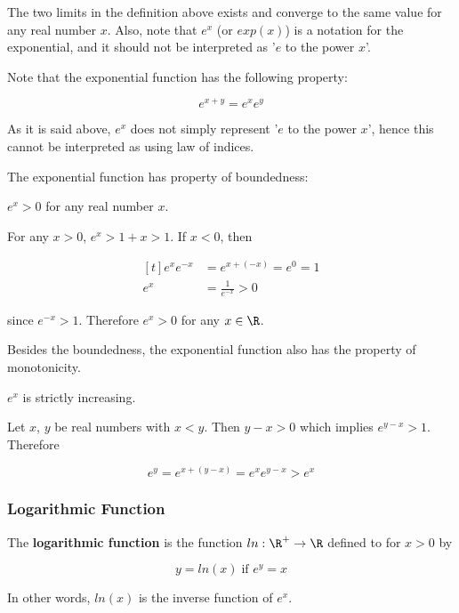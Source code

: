 The two limits in the definition above exists and converge to the same value for any real number $x$. Also, note that $e^{x}$ (or $exp(x)$) is a notation for the exponential, and it should not be interpreted as '$e$ to the power $x$'.\n

Note that the exponential function has the following property:

$$e^{x+y}=e^{x}e^{y}$$\s

As it is said above, $e^{x}$ does not simply represent '$e$ to the power $x$', hence this cannot be interpreted as using law of indices.\n

The exponential function has property of boundedness:\n

\begin{thm}
  $e^{x}>0$ for any real number $x$.\n

  \prf For any $x>0$, $e^{x}>1+x>1$. If $x<0$, then

  $$\begin{aligned}[t]
    e^{x}e^{-x}&=e^{x+(-x)}=e^{0}=1\\
    e^{x}&=\frac{1}{e^{-x}}>0
  \end{aligned}$$\s

  since $e^{-x}>1$. Therefore $e^{x}>0$ for any $x\in \R$.
\end{thm}\n

Besides the boundedness, the exponential function also has the property of monotonicity.\n

\begin{thm}
  $e^{x}$ is strictly increasing.\n

  \prf Let $x$, $y$ be real numbers with $x<y$. Then $y-x>0$ which implies $e^{y-x}>1$. Therefore

  $$e^{y}=e^{x+(y-x)}=e^{x}e^{y-x}>e^{x}$$
\end{thm}

\subsubsection{Logarithmic Function}
\begin{dft}
  The \textbf{logarithmic function} is the function $ln: \R^{+}\to \R$ defined to for $x>0$ by

  $$y=ln(x)\;\text{if }e^{y}=x$$
\end{dft}\n

In other words, $ln(x)$ is the inverse function of $e^{x}$.\n


